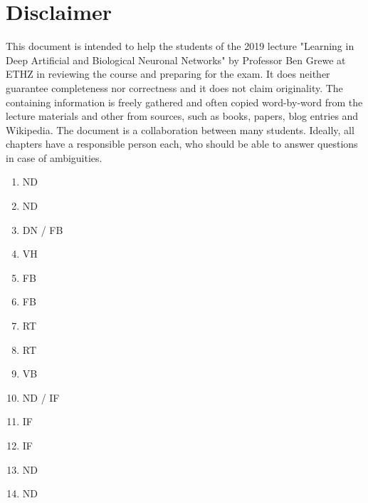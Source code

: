 \documentclass[main]{subfiles}
\begin{document}
\newpage
\section{Disclaimer}
This document is intended to help the students of the 2019 lecture "Learning in Deep Artificial and Biological Neuronal Networks" by Professor Ben Grewe at ETHZ in reviewing the course and preparing for the exam. It does neither guarantee completeness nor correctness and it does not claim originality. The containing information is freely gathered and often copied word-by-word from the lecture materials and other from sources, such as books, papers, blog entries and Wikipedia. The document is a collaboration between many students. Ideally, all chapters have a responsible person each, who should be able to answer questions in case of ambiguities. 
\begin{enumerate}
    \item ND
    \item ND
    \item DN / FB
    \item VH
    \item FB
    \item FB
    \item RT
    \item RT
    \item VB
    \item ND / IF
    \item IF
    \item IF
    \item ND
    \item ND
    
\end{enumerate}
\end{document}
